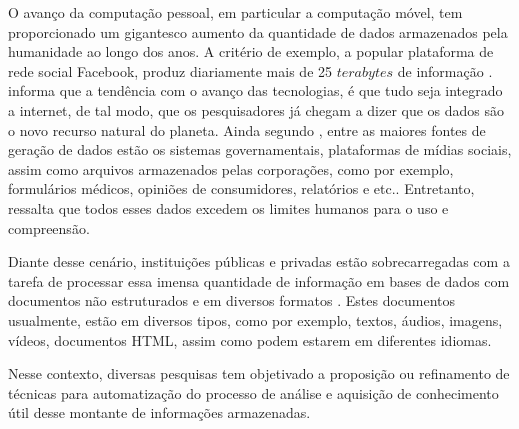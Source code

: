 
O avanço da computação pessoal, em particular a computação móvel, tem proporcionado um gigantesco
aumento da quantidade de dados armazenados pela humanidade ao longo dos anos. A critério de exemplo,
a popular plataforma de rede social Facebook\footnotemark, produz diariamente mais de 25 $terabytes$
de informação \cite{Havens2012}.  informa que a tendência com o avanço das
tecnologias, é que tudo seja integrado a internet, de tal modo, que os pesquisadores já chegam a
dizer que os dados são o novo recurso natural do planeta. Ainda segundo ,
entre as maiores fontes de geração de dados estão os sistemas governamentais, plataformas de mídias
sociais, assim como arquivos armazenados pelas corporações, como por exemplo, formulários médicos,
opiniões de consumidores, relatórios e etc.. Entretanto,  ressalta que 
todos esses dados excedem os limites humanos para o uso e compreensão.

Diante desse cenário, instituições públicas e privadas estão sobrecarregadas com a tarefa de
processar essa imensa quantidade de informação em bases de dados com documentos não estruturados e
em diversos formatos \cite{Kobayashi2008}. Estes documentos usualmente, estão em diversos tipos,
como por exemplo, textos, áudios, imagens, vídeos, documentos HTML, assim como podem estarem em
diferentes idiomas.

Nesse contexto, diversas pesquisas tem objetivado a proposição ou refinamento de técnicas para
automatização do processo de análise e aquisição de conhecimento útil desse montante de informações
armazenadas. 

